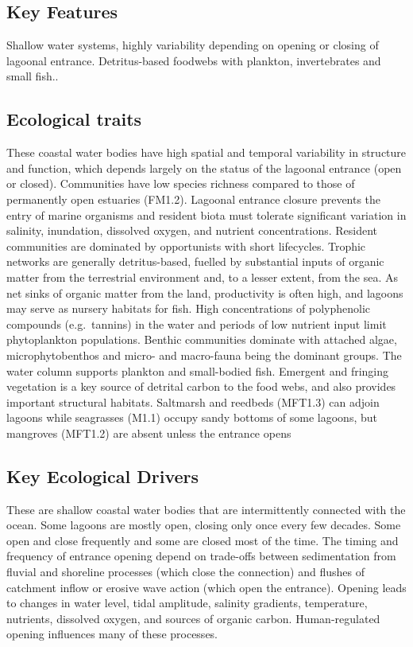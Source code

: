 \documentclass[
  letterpaper,
  DIV=11,
  numbers=noendperiod]{scrartcl}
\begin{document}
\subsection{Key Features}\label{key-features-133}

Shallow water systems, highly variability depending on opening or
closing of lagoonal entrance. Detritus-based foodwebs with plankton,
invertebrates and small fish..

\subsection{Ecological traits}\label{ecological-traits-133}

These coastal water bodies have high spatial and temporal variability in
structure and function, which depends largely on the status of the
lagoonal entrance (open or closed). Communities have low species
richness compared to those of permanently open estuaries (FM1.2).
Lagoonal entrance closure prevents the entry of marine organisms and
resident biota must tolerate significant variation in salinity,
inundation, dissolved oxygen, and nutrient concentrations. Resident
communities are dominated by opportunists with short lifecycles. Trophic
networks are generally detritus-based, fuelled by substantial inputs of
organic matter from the terrestrial environment and, to a lesser extent,
from the sea. As net sinks of organic matter from the land, productivity
is often high, and lagoons may serve as nursery habitats for fish. High
concentrations of polyphenolic compounds (e.g.~tannins) in the water and
periods of low nutrient input limit phytoplankton populations. Benthic
communities dominate with attached algae, microphytobenthos and micro-
and macro-fauna being the dominant groups. The water column supports
plankton and small-bodied fish. Emergent and fringing vegetation is a
key source of detrital carbon to the food webs, and also provides
important structural habitats. Saltmarsh and reedbeds (MFT1.3) can
adjoin lagoons while seagrasses (M1.1) occupy sandy bottoms of some
lagoons, but mangroves (MFT1.2) are absent unless the entrance opens

\subsection{Key Ecological Drivers}\label{key-ecological-drivers-133}

These are shallow coastal water bodies that are intermittently connected
with the ocean. Some lagoons are mostly open, closing only once every
few decades. Some open and close frequently and some are closed most of
the time. The timing and frequency of entrance opening depend on
trade-offs between sedimentation from fluvial and shoreline processes
(which close the connection) and flushes of catchment inflow or erosive
wave action (which open the entrance). Opening leads to changes in water
level, tidal amplitude, salinity gradients, temperature, nutrients,
dissolved oxygen, and sources of organic carbon. Human-regulated opening
influences many of these processes.
\end{document}
